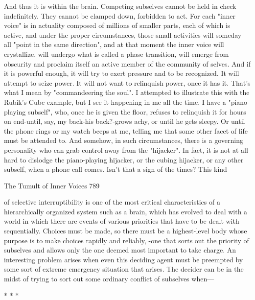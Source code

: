         And thus it is within the brain. Competing subselves cannot be held in check
indefinitely. They cannot be clamped down, forbidden to act. For each "inner voice"
is in actuality composed of millions of smaller parts, each of which is active, and
under the proper circumstances, those small activities will someday all "point in the
same direction", and at that moment the inner voice will crystallize, will undergo what
is called a phase transition, will emerge from obscurity and proclaim itself an active
member of the community of selves. And if it is powerful enough, it will try to exert
pressure and to be recognized. It will attempt to seize power. It will not want to
relinquish power, once it has it. That's what I mean by "commandeering the soul".
        I attempted to illustrate this with the Rubik's Cube example, but I see it
happening in me all the time. I have a "piano-playing subself", who, once he is given
the floor, refuses to relinquish it for hours on end-until, say, my back-his back?-grows
achy, or until he gets sleepy. Or until the phone rings or my watch beeps at me, telling
me that some other facet of life must be attended to.
        And somehow, in such circumstances, there is a governing personality who
can grab control away from the "hijacker". In fact, it is not at all hard to dislodge the
piano-playing hijacker, or the cubing hijacker, or any other subself, when a phone call
comes. Isn't that a sign of the times? This kind




The Tumult of Inner Voices                                                           789

of selective interruptibility is one of the most critical characteristics of a hierarchically
organized system such as a brain, which has evolved to deal with a world in which
there are events of various priorities that have to be dealt with sequentially. Choices
must be made, so there must be a highest-level body whose purpose is to make
choices rapidly and reliably, -one that sorts out the priority of subselves and allows
only the one deemed most important to take charge.
        An interesting problem arises when even this deciding agent must be
preempted by some sort of extreme emergency situation that arises. The decider can
be in the midst of trying to sort out some ordinary conflict of subselves when—

                                         *   *   *

